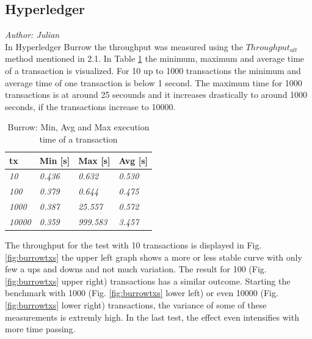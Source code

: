 \subsection{Hyperledger}

\textit{Author: Julian} \\
In Hyperledger Burrow the throughput was measured using the $Throughput_{alt}$ method mentioned in 2.1.
In Table \ref{table:4} the minimum, maximum and average time of a transaction is visualized. For 10 up to 1000 transactions
the minimum and average time of one transaction is below 1 second. The maximum time for 1000 transactions is at around 25
secounds and it increases drastically to around 1000 seconds, if the transactions increase to 10000.

\begin{table}[!h]
\centering
\begin{tabular}{l|l|l|l|}
\hline
\multicolumn{1}{|l|}{\textbf{tx}} & \textbf{Min {[}s{]}} & \textbf{Max {[}s{]}} & \textbf{Avg {[}s{]}} \\ \hline
\multicolumn{1}{|l|}{\textit{10}} & \textit{0.436} & \textit{0.632} & \textit{0.530} \\ \hline
\multicolumn{1}{|l|}{\textit{100}} & \textit{0.379} & \textit{0.644} & \textit{0.475} \\ \hline
\multicolumn{1}{|l|}{\textit{1000}} & \textit{0.387} & \textit{25.557} & \textit{0.572} \\ \hline
\multicolumn{1}{|l|}{\textit{10000}} & \textit{0.359} & \textit{999.583} & \textit{3.457} \\ \hline 
\end{tabular}
\caption{Burrow: Min, Avg and Max execution time of a transaction}
\label{table:4}
\end{table}

The throughput for the test with 10 transactions is displayed in Fig. \ref{fig:burrowtxs} the upper left graph shows a more or less
stable curve with only few a ups and downs and not much variation. The result for 100 (Fig. \ref{fig:burrowtxs} upper right)
transactions has a similar outcome. Starting the benchmark with 1000 (Fig. \ref{fig:burrowtxs} lower left) or even 10000
(Fig. \ref{fig:burrowtxs} lower right) transactions, the variance of some of these measurements is extremly high. In
the last test, the effect even intensifies with more time passing. \\[5mm]


